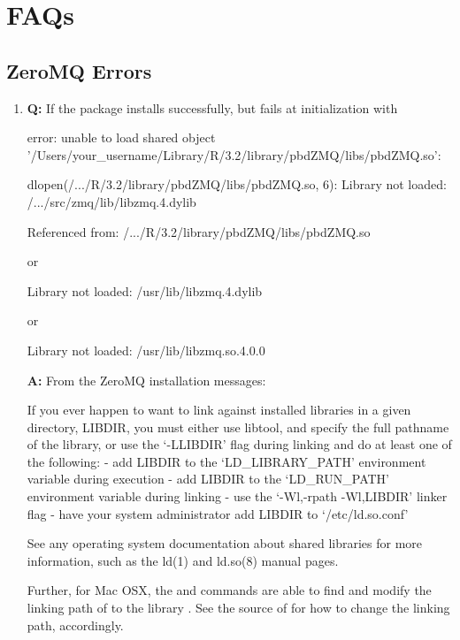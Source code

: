 
\section[FAQs]{FAQs}
\label{sec:faqs}


\subsection[ZeroMQ Errors]{ZeroMQ Errors}
\label{sec:zmq_errors}


\begin{enumerate}
\item {\bf\color{blue} Q:}
      If the package installs successfully, but fails at initialization with
\begin{Error}
error: unable to load shared object
'/Users/your_username/Library/R/3.2/library/pbdZMQ/libs/pbdZMQ.so':

dlopen(/.../R/3.2/library/pbdZMQ/libs/pbdZMQ.so, 6):
Library not loaded: /.../src/zmq/lib/libzmq.4.dylib

Referenced from: /.../R/3.2/library/pbdZMQ/libs/pbdZMQ.so
\end{Error}
or
\begin{Error}
Library not loaded: /usr/lib/libzmq.4.dylib
\end{Error}
or
\begin{Error}
Library not loaded: /usr/lib/libzmq.so.4.0.0
\end{Error}
      {\bf\color{blue} A:}
      From the ZeroMQ installation messages:
\begin{Code}
If you ever happen to want to link against installed libraries
in a given directory, LIBDIR, you must either use libtool, and
specify the full pathname of the library, or use the `-LLIBDIR'
flag during linking and do at least one of the following:
   - add LIBDIR to the `LD_LIBRARY_PATH' environment variable
     during execution
   - add LIBDIR to the `LD_RUN_PATH' environment variable
     during linking
   - use the `-Wl,-rpath -Wl,LIBDIR' linker flag
   - have your system administrator add LIBDIR to `/etc/ld.so.conf'

See any operating system documentation about shared libraries for
more information, such as the ld(1) and ld.so(8) manual pages.
\end{Code}

    Further, for Mac OSX, the  and 
    commands are able to find and modify the linking path of 
    to the library . See the source of
     for how to change the linking path,
    accordingly.

\end{enumerate}
